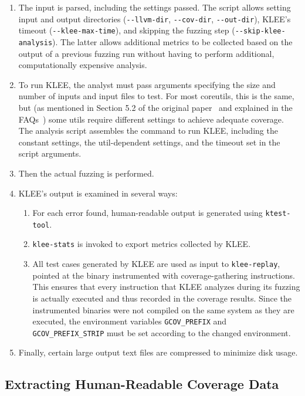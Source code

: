\documentclass{article}
\let\savedCite=\cite
\renewcommand{\cite}{\unskip~\savedCite}
\begin{document}
\begin{enumerate}
    \item The input is parsed, including the settings passed. The script allows setting input and output directories (\lstinline{--llvm-dir}, \lstinline{--cov-dir}, \lstinline{--out-dir}), KLEE's timeout (\lstinline{--klee-max-time}), and skipping the fuzzing step (\lstinline{--skip-klee-analysis}). The latter allows additional metrics to be collected based on the output of a previous fuzzing run without having to perform additional, computationally expensive analysis.
    \item To run KLEE, the analyst must pass arguments specifying the size and number of inputs and input files to test. For most coreutils, this is the same, but (as mentioned in Section 5.2 of the original paper\cite{KLEE} and explained in the FAQs\cite{KLEEFAQ}) some utils require different settings to achieve adequate coverage. The analysis script assembles the command to run KLEE, including the constant settings, the util-dependent settings, and the timeout set in the script arguments.
    \item Then the actual fuzzing is performed.
    \item KLEE's output is examined in several ways:
          \begin{enumerate}
              \item For each error found, human-readable output is generated using \lstinline{ktest-tool}.
              \item \lstinline{klee-stats} is invoked to export metrics collected by KLEE.
              \item All test cases generated by KLEE are used as input to \lstinline{klee-replay}, pointed at the binary instrumented with coverage-gathering instructions. This ensures that every instruction that KLEE analyzes during its fuzzing is actually executed and thus recorded in the coverage results. Since the instrumented binaries were not compiled on the same system as they are executed, the environment variables \lstinline{GCOV_PREFIX} and \lstinline{GCOV_PREFIX_STRIP} must be set according to the changed environment.
          \end{enumerate}
    \item Finally, certain large output text files are compressed to minimize disk usage.
\end{enumerate}

\subsection{Extracting Human-Readable Coverage Data}
\end{document}
